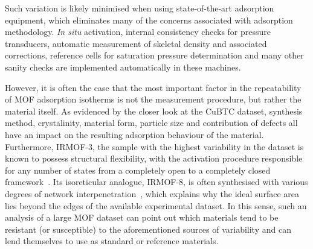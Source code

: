 Such variation is likely minimised when using state-of-the-art
adsorption equipment, which eliminates many of the concerns
associated with adsorption methodology. \textit{In situ}
activation, internal consistency checks for pressure transducers,
automatic measurement of skeletal density and associated
corrections, reference cells for saturation pressure determination
and many other sanity checks are implemented automatically in these 
machines.

However, it is often the case that the most important factor
in the repeatability of \gls{MOF} adsorption isotherms
is not the measurement procedure, but rather the material itself.
As evidenced by the closer look at the CuBTC dataset, synthesis
method, crystalinity, material form, particle size and contribution
of defects all have an impact on the resulting adsorption behaviour
of the material. Furthermore, IRMOF-3, the sample with the 
highest variability in the dataset is known to possess structural
flexibility, with the activation procedure responsible for 
any number of states from a completely open to a completely closed
framework~\cite{nelsonSupercriticalProcessingRoute2009}. Its
isoreticular analogue, IRMOF-8, is often synthesised with various 
degrees of network
interpenetration~\cite{feldblyumNoninterpenetratedIRMOF8Synthesis2012},
which explains why the ideal surface area lies beyond the edges of the
available experimental dataset. 
In this sense, such an analysis of a large \gls{MOF} dataset can point out 
which materials tend to be resistant (or susceptible) to the 
aforementioned sources of variability 
and can lend themselves to use as standard or reference materials.